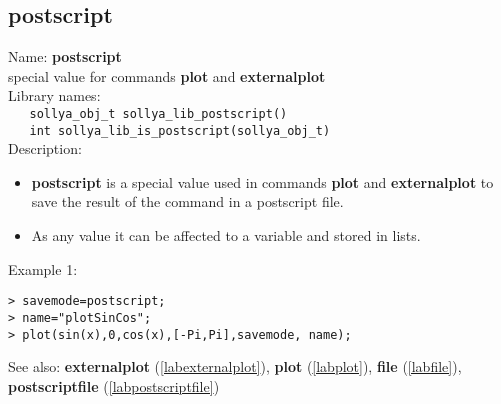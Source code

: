 \subsection{postscript}
\label{labpostscript}
\noindent Name: \textbf{postscript}\\
\phantom{aaa}special value for commands \textbf{plot} and \textbf{externalplot}\\[0.2cm]
\noindent Library names:\\
\verb|   sollya_obj_t sollya_lib_postscript()|\\
\verb|   int sollya_lib_is_postscript(sollya_obj_t)|\\[0.2cm]
\noindent Description: \begin{itemize}

\item \textbf{postscript} is a special value used in commands \textbf{plot} and \textbf{externalplot} to save
   the result of the command in a postscript file.

\item As any value it can be affected to a variable and stored in lists.
\end{itemize}
\noindent Example 1: 
\begin{center}\begin{minipage}{15cm}\begin{Verbatim}[frame=single,commandchars=\\\|\~]
> savemode=postscript;
> name="plotSinCos";
> plot(sin(x),0,cos(x),[-Pi,Pi],savemode, name);
\end{Verbatim}
\end{minipage}\end{center}
See also: \textbf{externalplot} (\ref{labexternalplot}), \textbf{plot} (\ref{labplot}), \textbf{file} (\ref{labfile}), \textbf{postscriptfile} (\ref{labpostscriptfile})
